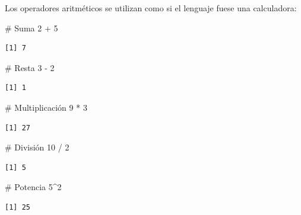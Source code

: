 \documentclass[
  spanish,
  a4paper,
]{scrbook}
\newenvironment{Shaded}{\begin{snugshade}}{\end{snugshade}}
\newcommand{\CommentTok}[1]{\textcolor[rgb]{0.37,0.37,0.37}{#1}}
\newcommand{\DecValTok}[1]{\textcolor[rgb]{0.68,0.00,0.00}{#1}}
\newcommand{\SpecialCharTok}[1]{\textcolor[rgb]{0.37,0.37,0.37}{#1}}
\begin{document}
Los operadores aritméticos se utilizan como si el lenguaje fuese una
calculadora:

\begin{Shaded}
\begin{Highlighting}[]
\CommentTok{\# Suma}
\DecValTok{2} \SpecialCharTok{+} \DecValTok{5}
\end{Highlighting}
\end{Shaded}

\begin{verbatim}
[1] 7
\end{verbatim}

\begin{Shaded}
\begin{Highlighting}[]
\CommentTok{\# Resta}
\DecValTok{3} \SpecialCharTok{{-}} \DecValTok{2}
\end{Highlighting}
\end{Shaded}

\begin{verbatim}
[1] 1
\end{verbatim}

\begin{Shaded}
\begin{Highlighting}[]
\CommentTok{\# Multiplicación}
\DecValTok{9} \SpecialCharTok{*} \DecValTok{3}
\end{Highlighting}
\end{Shaded}

\begin{verbatim}
[1] 27
\end{verbatim}

\begin{Shaded}
\begin{Highlighting}[]
\CommentTok{\# División}
\DecValTok{10} \SpecialCharTok{/} \DecValTok{2}
\end{Highlighting}
\end{Shaded}

\begin{verbatim}
[1] 5
\end{verbatim}

\begin{Shaded}
\begin{Highlighting}[]
\CommentTok{\# Potencia}
\DecValTok{5}\SpecialCharTok{\^{}}\DecValTok{2}
\end{Highlighting}
\end{Shaded}

\begin{verbatim}
[1] 25
\end{verbatim}
\end{document}
